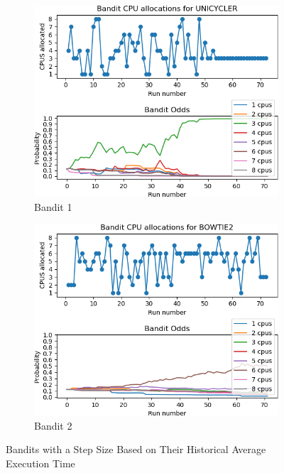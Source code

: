 \begin{figure}[ht]
\centering
\begin{subfigure}{.5\textwidth}
  \includegraphics[width=\textwidth,height=\textwidth]{fig/UNICYCLER.png}
  \caption{Bandit 1}
  \label{fig:sub3}
\end{subfigure}%
\begin{subfigure}{.5\textwidth}
  \includegraphics[width=\textwidth,height=\textwidth]{fig/BOWTIE2.png}
  \caption{Bandit 2}
  \label{fig:sub4}
\end{subfigure}
\caption{Bandits with a Step Size Based on Their Historical Average Execution Time}
\label{fig:fixed_bandits}
\end{figure}


